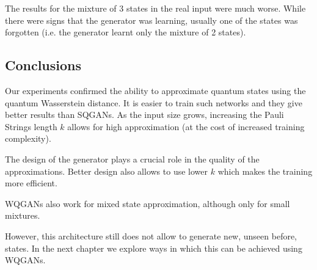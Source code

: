 The results for the mixture of 3 states in the real input were much worse. While
there were signs that the generator was learning, usually one of the
states was forgotten (i.e. the generator learnt only the mixture of 2 states).

\subsection{Conclusions}
Our experiments confirmed the ability to approximate quantum states using the
quantum Wasserstein distance. It is easier to train such networks and they give
better results than SQGANs. As the input size grows, increasing the Pauli
Strings length $k$ allows for high approximation (at the cost of increased
training complexity).

The design of the generator plays a crucial role in the quality of the
approximations. Better design also allows to use lower $k$ which makes the
training more efficient.

WQGANs also work for mixed state approximation, although only for small
mixtures.

However, this architecture still does not allow to generate new, unseen before,
states. In the next chapter we explore ways in which this can be achieved using WQGANs. 

